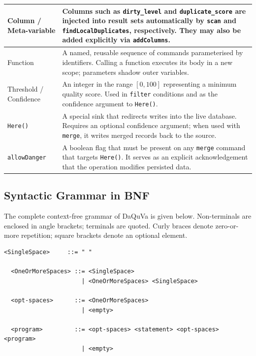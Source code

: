 \begin{itemize}[label=-, noitemsep]
\begin{table}[H]
\begin{tabular}{|p{4cm}|p{9cm}|}
Column / Meta-variable &
Columns such as \texttt{dirty\_level} and \texttt{duplicate\_score} are injected into result sets automatically by \texttt{scan} and \texttt{findLocalDuplicates}, respectively. They may also be added explicitly via \texttt{addColumns}. \\
\hline

Function &
A named, reusable sequence of commands parameterised by identifiers. Calling a function executes its body in a new scope; parameters shadow outer variables. \\
\hline

Threshold / Confidence &
An integer in the range $[0,100]$ representing a minimum quality score. Used in \texttt{filter} conditions and as the confidence argument to \texttt{Here()}. \\
\hline

\texttt{Here()} &
A special sink that redirects writes into the live database. Requires an optional confidence argument; when used with \texttt{merge}, it writes merged records back to the source. \\
\hline

\texttt{allowDanger} &
A boolean flag that must be present on any \texttt{merge} command that targets \texttt{Here()}. It serves as an explicit acknowledgement that the operation modifies persisted data. \\
\hline

\end{tabular}
\end{table}

\subsection{Syntactic Grammar in BNF}
\label{sec:bnf}

The complete context-free grammar of DaQuVa is given below.
Non-terminals are enclosed in angle brackets; terminals are quoted.
Curly braces denote zero-or-more repetition; square brackets denote an optional
element.

\begin{lstlisting}[style=bnf, caption={Complete BNF grammar of DaQuVa.}, label={lst:bnf}]
  <SingleSpace>     ::= " "
  
  <OneOrMoreSpaces> ::= <SingleSpace>
                      | <OneOrMoreSpaces> <SingleSpace>
  
  <opt-spaces>      ::= <OneOrMoreSpaces>
                      | <empty>
  
  <program>         ::= <opt-spaces> <statement> <opt-spaces> <program>
                      | <empty>
  

\end{lstlisting}
\end{itemize}
